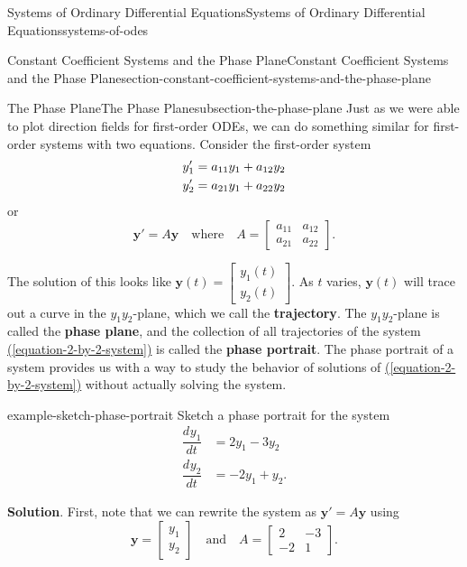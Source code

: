 \documentclass[oneside,10pt,]{book}
\newcommand{\terminology}[1]{\textbf{#1}}
\numberwithin{equation}{section}
\renewcommand{\vec}[1]{\mathbf{#1}}
\newcommand{\dv}[3][]{\dfrac{d^{#1} #2}{d #3^{#1}}}
\newcommand{\amp}{&}
\begin{document}
\begin{chapterptx}{Systems of Ordinary Differential Equations}{}{Systems of Ordinary Differential Equations}{}{}{systems-of-odes}
\begin{sectionptx}{Constant Coefficient Systems and the Phase Plane}{}{Constant Coefficient Systems and the Phase Plane}{}{}{section-constant-coefficient-systems-and-the-phase-plane}
%
\begin{subsectionptx}{The Phase Plane}{}{The Phase Plane}{}{}{subsection-the-phase-plane}
\hypertarget{p-367}{}%
Just as we were able to plot direction fields for first-order ODEs, we can do something similar for first-order systems with two equations. Consider the first-order system%
\begin{align}
y'_{1}  \amp =  a_{11}y_{1} + a_{12}y_{2}\label{equation-2-by-2-system}\\
y'_{2}  \amp =  a_{21}y_{1}+  a_{22}y_{2}\notag
\end{align}
or%
\begin{equation*}
\vec{y}' = A\vec{y}\quad\text{where}\quad A = \begin{bmatrix}a_{11}  \amp  a_{12}  \\  a_{21}  \amp  a_{22}\end{bmatrix}.
\end{equation*}
%
\par
\hypertarget{p-368}{}%
The solution of this looks like \(\vec{y}(t) = \begin{bmatrix}y_{1}(t) \\ y_{2}(t)\end{bmatrix}\). As \(t\) varies, \(\vec{y}(t)\) will trace out a curve in the \(y_{1}y_{2}\)-plane, which we call the \terminology{trajectory}. The \(y_{1}y_{2}\)-plane is called the \terminology{phase plane}, and the collection of all trajectories of the system \hyperref[equation-2-by-2-system]{(\ref{equation-2-by-2-system})} is called the \terminology{phase portrait}. The phase portrait of a system provides us with a way to study the behavior of solutions of \hyperref[equation-2-by-2-system]{(\ref{equation-2-by-2-system})} without actually solving the system.%
\begin{example}{}{example-sketch-phase-portrait}%
\hypertarget{p-369}{}%
Sketch a phase portrait for the system%
\begin{align*}
\dv{y_{1}}{t}  \amp =  2y_{1} - 3y_{2}\\
\dv{y_{2}}{t}  \amp =  -2y_{1} + y_{2}.
\end{align*}
%
\par\smallskip%
\noindent\textbf{Solution}.\hypertarget{solution-59}{}\quad%
\hypertarget{p-370}{}%
First, note that we can rewrite the system as \(\vec{y}' = A\vec{y}\) using%
\begin{equation*}
\vec{y} = \begin{bmatrix}y_{1}\\y_{2}\end{bmatrix}\quad\text{and}\quad A = \begin{bmatrix}2 \amp  -3 \\-2 \amp  1\end{bmatrix}.

\end{equation*}
\end{example}
\end{subsectionptx}
\end{sectionptx}
\end{chapterptx}
\end{document}
